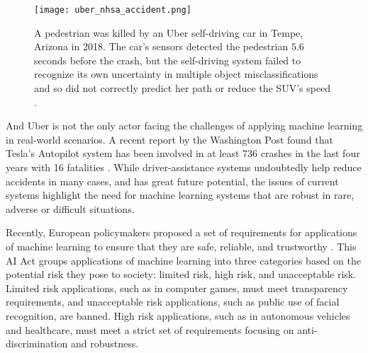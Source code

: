 \begin{figure}[t]
    \centering
    \texttt{[image: uber\_nhsa\_accident.png]}
    \caption{A pedestrian was killed by an Uber self-driving car in Tempe, Arizona in 2018. The car's sensors detected the pedestrian $5.6$ seconds before the crash, but the self-driving system failed to recognize its own uncertainty in multiple object misclassifications and so did not correctly predict her path or reduce the SUV's speed \cite{nationaltransportationsafetyboardnhsa_collision_2019}.}
    \label{fig:uber_nhsa_accident}
\end{figure}

And Uber is not the only actor facing the challenges of applying machine learning in real-world scenarios. A recent report by the Washington Post found that Tesla's Autopilot system has been involved in at least 736 crashes in the last four years with 16 fatalities \cite{siddiqui_17_2023}. 
While driver-assistance systems undoubtedly help reduce accidents in many cases, and has great future potential, the issues of current systems highlight the need for machine learning systems that are robust in rare, adverse or difficult situations. 

Recently, European policymakers proposed a set of requirements for applications of machine learning to ensure that they are safe, reliable, and trustworthy \cite{europeancommission_briefing_2021}. This AI Act groups applications of machine learning into three categories based on the potential risk they pose to society: limited risk, high risk, and unacceptable risk. Limited risk applications, such as in computer games, must meet transparency requirements, and unacceptable risk applications, such as public use of facial recognition, are banned. High risk applications, such as in autonomous vehicles and healthcare, must meet a strict set of requirements focusing on anti-discrimination and robustness.

